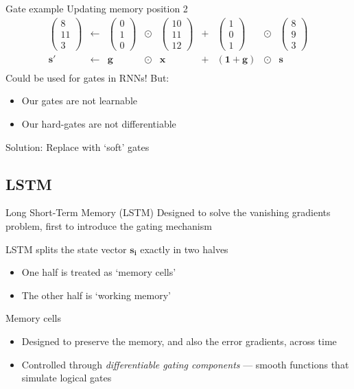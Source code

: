 \documentclass[12pt,aspectratio=169,handout]{beamer}
\begin{document}
\begin{frame}{Gate example}
Updating memory position 2
$$
\begin{aligned}
\begin{pmatrix}
8 \\ 11 \\ 3
\end{pmatrix}
&\gets
&\begin{pmatrix}
0 \\ 1 \\ 0
\end{pmatrix}
&
\odot
&\begin{pmatrix}
10 \\ 11 \\ 12
\end{pmatrix}
&+
&\begin{pmatrix}
1 \\ 0 \\ 1
\end{pmatrix}
&\odot
&\begin{pmatrix}
8 \\ 9 \\ 3
\end{pmatrix}
\\
\bm{s'} &\gets &\bm{g} &\odot &\bm{x} &+ &(\bm{1} + \bm{g}) &\odot &\bm{s} \\
\end{aligned}
$$
\pause
Could be used for gates in RNNs! But:
\begin{itemize}
	\item Our gates are not learnable
	\item Our hard-gates are not differentiable
\end{itemize}
Solution: Replace with `soft' gates
\end{frame}

\subsection{LSTM}

\begin{frame}{Long Short-Term Memory (LSTM)}
Designed to solve the vanishing gradients problem, first to introduce the gating mechanism

\pause
LSTM splits the state vector $\bm{s_i}$ exactly in two halves
\begin{itemize}
	\item One half is treated as `memory cells'
	\item The other half is `working memory'
\end{itemize}

\pause
\begin{block}{Memory cells}
\begin{itemize}
	\item Designed to preserve the memory, and also the error gradients, across time
	\item Controlled through \emph{differentiable gating components} --- smooth functions that simulate logical gates
\end{itemize}
\end{block}


\end{frame}
\end{document}
